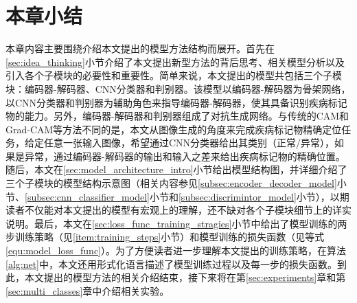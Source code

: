 \section{本章小结}\label{sec:chapter3_summary}
本章内容主要围绕介绍本文提出的模型方法结构而展开。首先在\ref{sec:idea_thinking}小节介绍了本文提出新型方法的背后思考、相关模型分析以及引入各个子模块的必要性和重要性。简单来说，本文提出的模型共包括三个子模块：编码器-解码器、CNN分类器和判别器。该模型以编码器-解码器为骨架网络，以CNN分类器和判别器为辅助角色来指导编码器-解码器，使其具备识别疾病标记物的能力。另外，编码器-解码器和判别器组成了对抗生成网络。与传统的CAM和Grad-CAM等方法不同的是，本文从图像生成的角度来完成疾病标记物精确定位任务，给定任意一张输入图像，希望通过CNN分类器给出其类别（正常/异常），如果是异常，通过编码器-解码器的输出和输入之差来给出疾病标记物的精确位置。随后，本文在\ref{sec:model_architecture_intro}小节给出模型结构图，并详细介绍了三个子模块的模型结构示意图（相关内容参见\ref{subsec:encoder_decoder_model}小节、\ref{subsec:cnn_classifier_model}小节和\ref{subsec:discrimintor_model}小节），以期读者不仅能对本文提出的模型有宏观上的理解，还不缺对各个子模块细节上的详实说明。最后，本文在\ref{sec:loss_func_training_stragies}小节中给出了模型训练的两步训练策略（见\ref{item:training_steps}小节）和模型训练的损失函数（见等式\ref{equ:model_loss_func}）。为了方便读者进一步理解本文提出的训练策略，在算法\ref{alg:net}中，本文还用形式化语言描述了模型训练过程以及每一步的损失函数。到此，本文提出的模型方法的相关介绍结束，接下来将在第\ref{sec:experiments}章和第\ref{sec:multi_classes}章中介绍相关实验。

